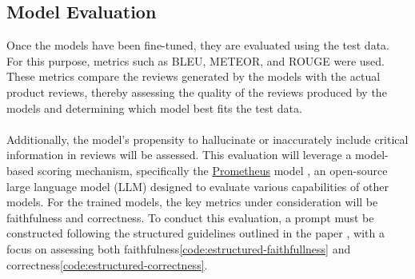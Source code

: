 \subsection{Model Evaluation}\label{subsec:model-evaluation}
Once the models have been fine-tuned, they are evaluated using the test data. For this purpose, metrics such as BLEU, METEOR, and ROUGE were used. These metrics compare the reviews generated by the models with the actual product reviews, thereby assessing the quality of the reviews produced by the models and determining which model best fits the test data.
\\\\
Additionally, the model's propensity to hallucinate or inaccurately include critical information in reviews will be assessed. This evaluation will leverage a model-based scoring mechanism, specifically the \href{https://huggingface.co/prometheus-eval/prometheus-7b-v2.0}{Prometheus} model \cite{kim2024prometheus2opensource}, an open-source large language model (LLM) designed to evaluate various capabilities of other models. For the trained models, the key metrics under consideration will be faithfulness and correctness. To conduct this evaluation, a prompt must be constructed following the structured guidelines outlined in the paper \cite{kim2024prometheus2opensource}, with a focus on assessing both faithfulness\ref{code:estructured-faithfullness} and correctness\ref{code:estructured-correctness}.

